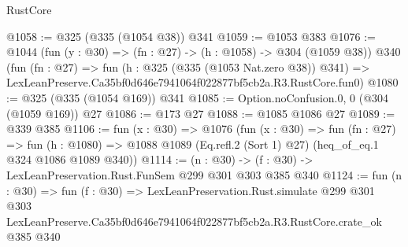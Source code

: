 \begin{lexlean}{RustCore}
\begin{coremodule}
@1058 := @325 (@335 (@1054 @38)) @341
@1059 := @1053 @383
@1076 := @1044
    (fun (y : @30) => (fn : @27) -> (h : @1058) -> @304 (@1059 @38))
    @340
    (fun (fn : @27) =>
    fun (h : @325 (@335 (@1053 Nat.zero @38)) @341) =>
    LexLeanPreserve.Ca35bf0d646e7941064f022877bf5cb2a.R3.RustCore.fun0)
@1080 := @325 (@335 (@1054 @169)) @341
@1085 := Option.noConfusion.{0, 0} (@304 (@1059 @169)) @27
@1086 := @173 @27
@1088 := @1085 @1086 @27
@1089 := @339 @385
@1106 := fun (x : @30) =>
  @1076
    (fun (x : @30) =>
    fun (fn : @27) =>
    fun (h : @1080) => @1088 @1089 (Eq.refl.{2} (Sort 1) @27) (heq_of_eq.{1} @324 @1086 @1089 @340))
@1114 := (n : @30) -> (f : @30) -> LexLeanPreservation.Rust.FunSem @299 @301 @303 @385 @340
@1124 := fun (n : @30) =>
  fun (f : @30) =>
  LexLeanPreservation.Rust.simulate
    @299
    @301
    @303
    LexLeanPreserve.Ca35bf0d646e7941064f022877bf5cb2a.R3.RustCore.crate_ok
    @385
    @340
\end{coremodule}
\end{lexlean}
